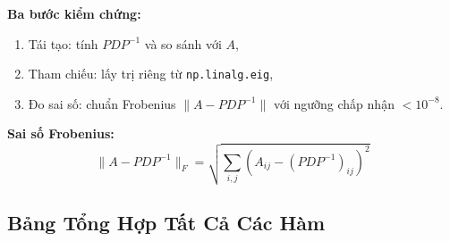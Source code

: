 \documentclass[a4paper,12pt]{report}
\begin{document}
\textbf{Ba bước kiểm chứng:}
\begin{enumerate}
  \item Tái tạo: tính $P D P^{-1}$ và so sánh với $A$,
  \item Tham chiếu: lấy trị riêng từ \texttt{np.linalg.eig},
  \item Đo sai số: chuẩn Frobenius $\|A - P D P^{-1}\|$ với ngưỡng chấp nhận $< 10^{-8}$.
\end{enumerate}

\textbf{Sai số Frobenius:}
\[
  \|A - P D P^{-1}\|_F = \sqrt{\sum_{i,j} \left(A_{ij} - (P D P^{-1})_{ij}\right)^2}
\]

\subsection{Bảng Tổng Hợp Tất Cả Các Hàm}
\end{document}
